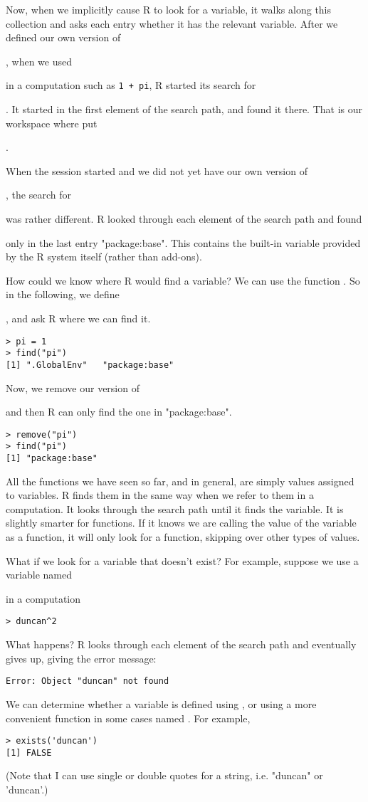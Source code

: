 {{{{{{{{{{{ Now, when we implicitly cause R to look for a variable, it walks along this collection and asks each entry whether it has the relevant variable. After we defined our own version of {, when we used { in a computation such as \verb|1 + pi|, R started its search for {. It started in the first element of the search path, and found it there. That is our workspace where put {. 

 When the session started and we did not yet have our own version of {, the search for { was rather different. R looked through each element of the search path and found { only in the last entry "package:base". This contains the built-in variable provided by the R system itself (rather than add-ons). 

 How could we know where R would find a variable? We can use the function . So in the following, we define {, and ask R where we can find it. 
\begin{verbatim}
> pi = 1
> find("pi")
[1] ".GlobalEnv"   "package:base"
\end{verbatim}
 Now, we remove our version of { and then R can only find the one in "package:base". 
\begin{verbatim}
> remove("pi")
> find("pi")
[1] "package:base"
\end{verbatim}
 All the functions we have seen so far, and in general, are simply values assigned to variables. R finds them in the same way when we refer to them in a computation. It looks through the search path until it finds the variable. It is slightly smarter for functions. If it knows we are calling the value of the variable as a function, it will only look for a function, skipping over other types of values. 

 What if we look for a variable that doesn't exist? For example, suppose we use a variable named { in a computation 
\begin{verbatim}
> duncan^2
\end{verbatim}
 What happens? R looks through each element of the search path and eventually gives up, giving the error message: 
\begin{verbatim}
Error: Object "duncan" not found
\end{verbatim}
 We can determine whether a variable is defined using , or using a more convenient function in some cases named . For example, 
\begin{verbatim}
> exists('duncan')
[1] FALSE
\end{verbatim}
 (Note that I can use single or double quotes for a string, i.e. "duncan" or 'duncan'.)

}}}}}}}}}}}}}}}}}}}}}
